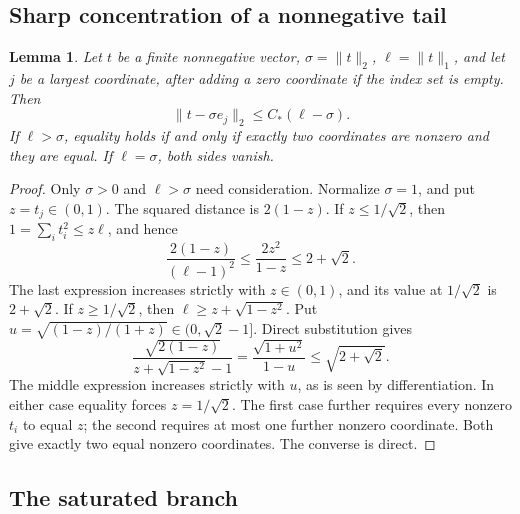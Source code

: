 \documentclass[11pt]{article}
\newtheorem{lemma}[theorem]{Lemma}
\theoremstyle{remark}\newtheorem{remark}[theorem]{Remark}
\begin{document}
\subsection{Sharp concentration of a nonnegative tail}

\begin{lemma}\label{lem:sharp-tail-concentration}
Let $t$ be a finite nonnegative vector, $\sigma=\|t\|_2$,
$\ell=\|t\|_1$, and let $j$ be a largest coordinate, after adding a zero
coordinate if the index set is empty. Then
\[
 \|t-\sigma e_j\|_2\le C_*(\ell-\sigma).
\]
If $\ell>\sigma$, equality holds if and only if exactly two coordinates
are nonzero and they are equal. If $\ell=\sigma$, both sides vanish.
\end{lemma}
\begin{proof}
Only $\sigma>0$ and $\ell>\sigma$ need consideration. Normalize
$\sigma=1$, and put $z=t_j\in(0,1)$. The squared distance is $2(1-z)$.
If $z\le1/\sqrt2$, then $1=\sum_i t_i^2\le z\ell$, and hence
\[
 \frac{2(1-z)}{(\ell-1)^2}\le\frac{2z^2}{1-z}\le2+\sqrt2.
\]
The last expression increases strictly with $z\in(0,1)$, and its value
at $1/\sqrt2$ is $2+\sqrt2$.
If $z\ge1/\sqrt2$, then
$\ell\ge z+\sqrt{1-z^2}$. Put
$u=\sqrt{(1-z)/(1+z)}\in(0,\sqrt2-1]$. Direct substitution gives
\[
 \frac{\sqrt{2(1-z)}}{z+\sqrt{1-z^2}-1}
 =\frac{\sqrt{1+u^2}}{1-u}\le\sqrt{2+\sqrt2}.
\]
The middle expression increases strictly with $u$, as is seen by
differentiation. In either case equality forces $z=1/\sqrt2$.
The first case further requires every nonzero $t_i$ to equal $z$;
the second requires at most one further nonzero coordinate.
Both give exactly two equal nonzero coordinates. The converse is direct.
\end{proof}

\subsection{The saturated branch}
\end{document}
